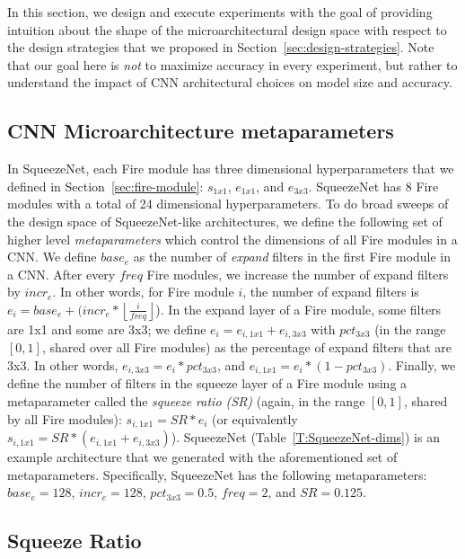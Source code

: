\documentclass{article} \usepackage{iclr2017_conference,times}
\def\vsp{\vspace{-0.15in}}
\begin{document}
In this section, we design and execute experiments with the goal of providing intuition about the shape of the microarchitectural design space with respect to the design strategies that we proposed in Section~\ref{sec:design-strategies}.
Note that our goal here is {\em not} to maximize accuracy in every experiment, but rather to understand the impact of CNN architectural choices on model size and accuracy.

\subsection{CNN Microarchitecture metaparameters}
\label{sec:metaparameters}
\vsp

In SqueezeNet, each Fire module has three dimensional hyperparameters that we defined in Section~\ref{sec:fire-module}: $s_{1x1}$, $e_{1x1}$, and $e_{3x3}$. 
SqueezeNet has 8 Fire modules with a total of 24 dimensional hyperparameters.
To do broad sweeps of the design space of SqueezeNet-like architectures, we define the following set of higher level {\em metaparameters} which control the dimensions of all Fire modules in a CNN.
We define $base_e$ as the number of {\em expand} filters in the first Fire module in a CNN.
After every $freq$ Fire modules, we increase the number of expand filters by $incr_e$.
In other words, for Fire module $i$, the number of expand filters is $e_i=base_e + (incr_e*{\left\lfloor{\frac{i}{freq}}\right\rfloor}$).
In the expand layer of a Fire module, some filters are 1x1 and some are 3x3; we define $e_i = e_{i,{1x1}} + e_{i,{3x3}}$ with $pct_{3x3}$ (in the range $[0,1]$, shared over all Fire modules) as the percentage of expand filters that are 3x3.
In other words, $e_{i,{3x3}} = e_i*pct_{3x3}$, and $e_{i,{1x1}} = e_i*(1-pct_{3x3})$. 
Finally, we define the number of filters in the squeeze layer of a Fire module using a metaparameter called the {\em squeeze ratio (SR)} (again, in the range $[0,1]$, shared by all Fire modules): $s_{i,{1x1}} = SR * e_i$ (or equivalently $s_{i,{1x1}} = SR * (e_{i,{1x1}} + e_{i,{3x3}})$).
SqueezeNet (Table~\ref{T:SqueezeNet-dims}) is an example architecture that we generated with the aforementioned set of metaparameters.
Specifically, SqueezeNet has the following metaparameters: $base_e = 128$, $incr_e = 128$, $pct_{3x3} = 0.5$, $freq=2$, and $SR = 0.125$.

\subsection{Squeeze Ratio}
\label{sec:SR}
\vsp
\end{document}

